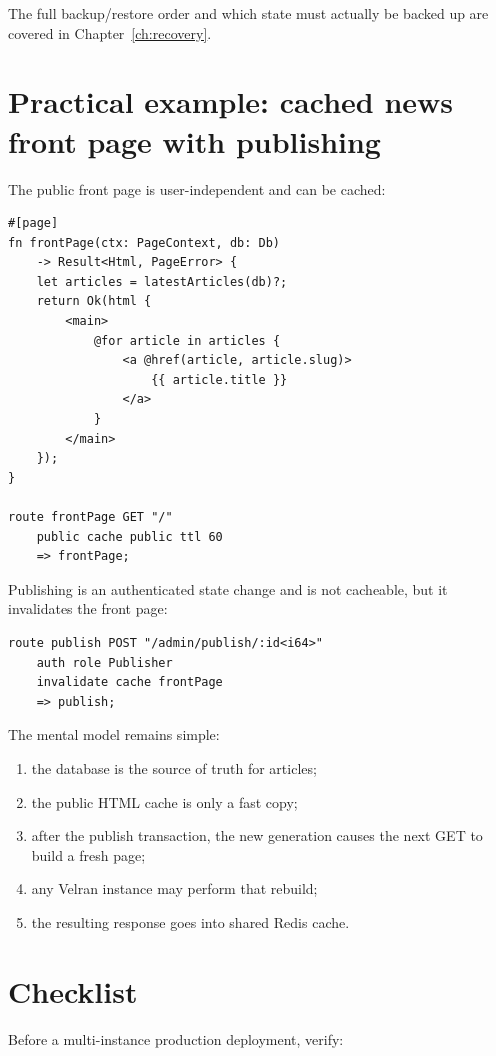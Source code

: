 The full backup/restore order and which state must actually be backed up are covered in Chapter~\ref{ch:recovery}.

\section{Practical example: cached news front page with publishing}

The public front page is user-independent and can be cached:

\begin{lstlisting}[language=Velran]
#[page]
fn frontPage(ctx: PageContext, db: Db)
    -> Result<Html, PageError> {
    let articles = latestArticles(db)?;
    return Ok(html {
        <main>
            @for article in articles {
                <a @href(article, article.slug)>
                    {{ article.title }}
                </a>
            }
        </main>
    });
}

route frontPage GET "/"
    public cache public ttl 60
    => frontPage;
\end{lstlisting}

Publishing is an authenticated state change and is not cacheable, but it invalidates the front page:

\begin{lstlisting}[language=Velran]
route publish POST "/admin/publish/:id<i64>"
    auth role Publisher
    invalidate cache frontPage
    => publish;
\end{lstlisting}

The mental model remains simple:

\begin{enumerate}
  \item the database is the source of truth for articles;
  \item the public HTML cache is only a fast copy;
  \item after the publish transaction, the new generation causes the next GET to build a fresh page;
  \item any Velran instance may perform that rebuild;
  \item the resulting response goes into shared Redis cache.
\end{enumerate}

\section{Checklist}

Before a multi-instance production deployment, verify:

